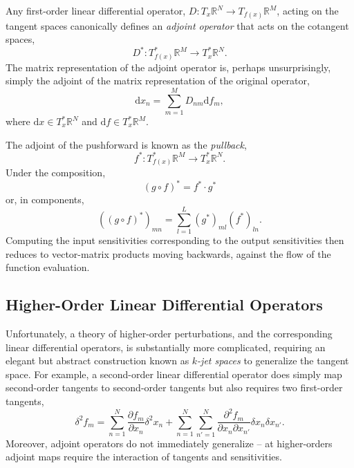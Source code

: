 Any first-order linear differential operator,
$D : T_{x} \mathbb{R}^{N} \rightarrow T_{ f ( x ) } \mathbb{R}^{M}$, acting on
the tangent spaces canonically defines an \textit{adjoint operator} that acts on the 
cotangent spaces,
%
\begin{equation*}
D^{*} : T^{*}_{f (x) } \mathbb{R}^{M} \rightarrow T^{*}_{x} \mathbb{R}^{N}.
\end{equation*}
%
The matrix representation of the adjoint operator is, perhaps unsurprisingly, 
simply the adjoint of the matrix representation of the original operator,
%
\begin{equation*}
\mathrm{d} x_{n} = \sum_{m = 1}^{M} D_{nm} \mathrm{d} f_{m},
\end{equation*}
%
where $\mathrm{d} x \in T^{*}_{x} \mathbb{R}^{N}$ and
$\mathrm{d} f \in T^{*}_{x} \mathbb{R}^{M}$.

The adjoint of the pushforward is known as the \textit{pullback},
%
\begin{equation*}
f^{*} : T^{*}_{f (x) } \mathbb{R}^{M} \rightarrow T^{*}_{x} \mathbb{R}^{N}.
\end{equation*}
%
Under the composition,
%
\begin{equation*}
\left( g \circ f \right)^{*} = f^{*} \cdot g^{*}
\end{equation*}
%
or, in components,
%
\begin{equation*}
\left( \left( g \circ f \right)^{*} \right)_{mn} = 
\sum_{l = 1}^{L} \left( g^{*} \right)_{ml} \left( f^{*} \right)_{ln}.
\end{equation*}
%
Computing the input sensitivities corresponding to the output sensitivities then reduces
to vector-matrix products moving backwards, against the flow of the function evaluation.

\subsection{Higher-Order Linear Differential Operators}

Unfortunately, a theory of higher-order perturbations, and the corresponding
linear differential operators, is substantially more complicated, requiring an elegant but
abstract construction known as \textit{$k$-jet spaces} to generalize the tangent space.  
For example, a second-order linear differential operator does simply map second-order 
tangents to second-order tangents but also requires two first-order tangents,
%
 \begin{equation*}
\delta^{2} f_{m} 
= \sum_{n = 1}^{N} \frac{ \partial f_{m} }{ \partial x_{n} } \delta^{2} x_{n} 
+ \sum_{n = 1}^{N} \sum_{n' = 1}^{N} 
\frac{ \partial^{2} f_{m} }{ \partial x_{n} \partial x_{n'} } 
\delta x_{n} \delta x_{n'}.
\end{equation*}
%
Moreover, adjoint operators do not immediately generalize -- at higher-orders adjoint
maps require the interaction of tangents and sensitivities.

